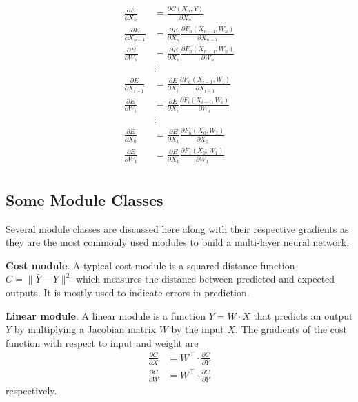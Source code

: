 \begin{align*}
 \frac{\partial E}{\partial X_n} &= \frac{\partial C(X_n, Y)}{\partial X_n}\\
 \frac{\partial E}{\partial X_{n-1}} &=\frac{\partial E}{\partial X_n} \frac{\partial F_n(X_{n-1},W_n)}{\partial X_{n-1}} \\  
 \frac{\partial E}{\partial W_n} &=\frac{\partial E}{\partial X_n} \frac{\partial F_n(X_{n-1},W_n)}{\partial W_n} \\
 &\vdots\\ 
 \frac{\partial E}{\partial X_{i-1}} &=\frac{\partial E}{\partial X_i} \frac{\partial F_n(X_{i-1},W_i)}{\partial X_{i-1}} \\  
 \frac{\partial E}{\partial W_i} &=\frac{\partial E}{\partial X_i} \frac{\partial F_i(X_{i-1},W_i)}{\partial W_i} \\
   &\vdots\\ 
 \frac{\partial E}{\partial X_0} &=\frac{\partial E}{\partial X_1} \frac{\partial F_n(X_0,W_1)}{\partial X_0} \\  
 \frac{\partial E}{\partial W_1} &=\frac{\partial E}{\partial X_1} \frac{\partial F_1(X_0,W_1)}{\partial W_1} \\
\end{align*}

\subsection{Some Module Classes}\label{ssc:Module Classes}

Several module classes are discussed here along with their respective gradients as they are the most commonly used modules to build a multi-layer neural network.

\textbf{Cost module}.
A typical cost module is a squared distance function $C=\|\bar{Y}-Y\|^2$ which measures the distance between predicted and expected outputs.
It is mostly used to indicate errors in prediction.

\textbf{Linear module}.
A linear module is a function $Y=W\cdot X$ that predicts an output $Y$ by multiplying a Jacobian matrix $W$ by the input $X$.
The gradients of the cost function with respect to input and weight are 
\begin{align*}
    \frac{\partial C}{\partial X} &= W^\top \cdot \frac{\partial C}{\partial Y} \\
    \frac{\partial C}{\partial W} &= W^\top \cdot \frac{\partial C}{\partial Y} 
\end{align*}
respectively.

